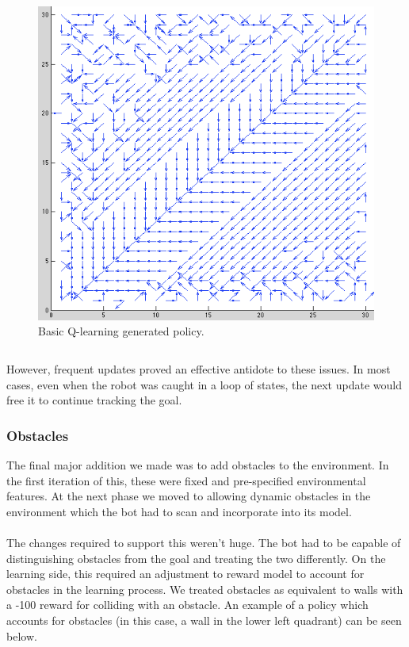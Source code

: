 \documentclass{aiaa-tc}%
\begin{document}
\begin{figure}[htbp]
  \centering
  \includegraphics[width=\linewidth]{images/BasicPolicy.png} 
  \caption{Basic Q-learning generated policy.}
  \label{fig:basicQ}
\end{figure}
\clearpage
\begin{verbatim}
\end{verbatim}
However, frequent updates proved an effective antidote to these
issues. In most cases, even when the robot was caught in a loop of
states, the next update would free it to continue tracking the goal.

\subsubsection{Obstacles}
The final major addition we made was to add obstacles to the
environment. In the first iteration of this, these were fixed and
pre-specified environmental features. At the next phase we moved to
allowing dynamic obstacles in the environment which the bot had to
scan and incorporate into its model. \\ \\
The changes required to support this weren't huge. The bot had to be
capable of distinguishing obstacles from the goal and treating the two
differently. On the learning side, this required an adjustment to
reward model to account for obstacles in the learning
process. We treated obstacles as equivalent to walls with a -100
reward for colliding with an obstacle. An example of a policy which
accounts for obstacles (in this case, a wall in the lower left quadrant) can be
seen below. 
\vspace{.3in}
\end{document}
